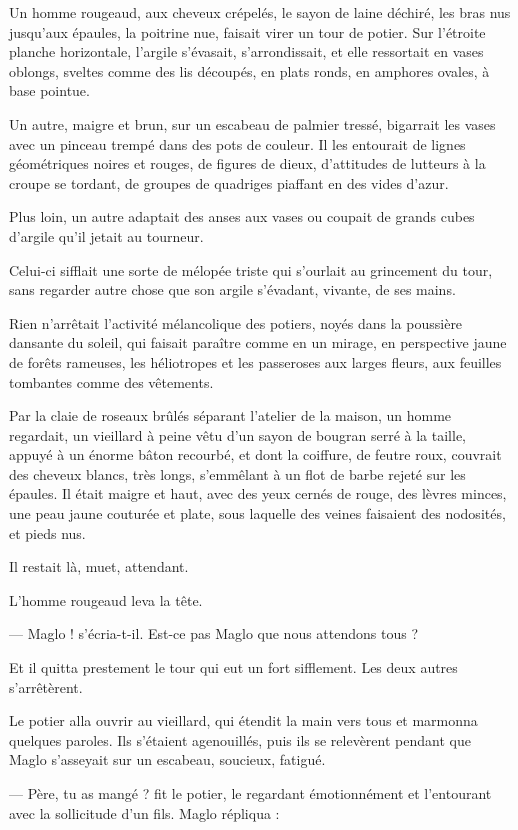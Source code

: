\documentclass[a4paper, 11pt, oneside, polutonikogreek, french]{article}
\begin{document}
Un homme rougeaud, aux cheveux crépelés, le sayon de laine déchiré, les bras nus jusqu'aux épaules, la poitrine nue, faisait virer un tour de potier. Sur l'étroite planche horizontale, l'argile s'évasait, s'arrondissait, et elle ressortait en vases oblongs, sveltes comme des lis découpés, en plats ronds, en amphores ovales, à base pointue.

Un autre, maigre et brun, sur un escabeau de palmier tressé, bigarrait les vases avec un pinceau trempé dans des pots de couleur. Il les entourait de lignes géométriques noires et rouges, de figures de dieux, d'attitudes de lutteurs à la croupe se tordant, de groupes de quadriges piaffant en des vides d'azur.

Plus loin, un autre adaptait des anses aux vases ou coupait de grands cubes d'argile qu'il jetait au tourneur.

Celui-ci sifflait une sorte de mélopée triste qui s'ourlait au grincement du tour, sans regarder autre chose que son argile s'évadant, vivante, de ses mains.

Rien n'arrêtait l'activité mélancolique des potiers, noyés dans la poussière dansante du soleil, qui faisait paraître comme en un mirage, en perspective jaune de forêts rameuses, les héliotropes et les passeroses aux larges fleurs, aux feuilles tombantes comme des vêtements.

Par la claie de roseaux brûlés séparant l'atelier de la maison, un homme regardait, un vieillard à peine vêtu d'un sayon de bougran serré à la taille, appuyé à un énorme bâton recourbé, et dont la coiffure, de feutre roux, couvrait des cheveux blancs, très longs, s'emmêlant à un flot de barbe rejeté sur les épaules. Il était maigre et haut, avec des yeux cernés de rouge, des lèvres minces, une peau jaune couturée et plate, sous laquelle des veines faisaient des nodosités, et pieds nus.

Il restait là, muet, attendant.

L'homme rougeaud leva la tête.

--- Maglo ! s'écria-t-il. Est-ce pas Maglo que nous attendons tous ?

Et il quitta prestement le tour qui eut un fort sifflement. Les deux autres s'arrêtèrent.

Le potier alla ouvrir au vieillard, qui étendit la main vers tous et marmonna quelques paroles. Ils s'étaient agenouillés, puis ils se relevèrent pendant que Maglo s'asseyait sur un escabeau, soucieux, fatigué.

--- Père, tu as mangé ? fit le potier, le regardant émotionnément et l'entourant avec la sollicitude d'un fils. Maglo répliqua :
\end{document}
